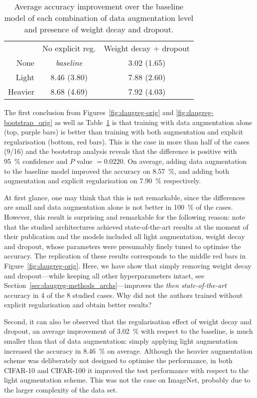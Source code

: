 {\begin{table}[hb]
\begin{center}
\begin{tabular}{rcc}
            & No explicit reg.  & Weight decay + dropout \\
    None    & \textit{baseline} & 3.02 (1.65)            \\
    Light   & 8.46 (3.80)       & 7.88 (2.60)            \\
    Heavier & 8.68 (4.69)       & 7.92 (4.03) 
\end{tabular}
\end{center}
\caption{Average accuracy improvement over the baseline model of each combination of data augmentation level and presence of weight decay and dropout.}
\label{tab:daugreg-orig_nets}
\end{table}

The first conclusion from Figures~\ref{fig:daugreg-orig} and \ref{fig:daugreg-bootstrap_orig} as well as Table~\ref{tab:daugreg-orig_nets} is that training with data augmentation alone (top, purple bars) is better than training with both augmentation and explicit regularisation (bottom, red bars). This is the case in more than half of the cases (9/16) and the bootstrap analysis reveals that the difference is positive with 95~\% confidence and $P$ value $=0.0220$. On average, adding data augmentation to the baseline model improved the accuracy on 8.57~\%, and adding both augmentation and explicit regularisation on 7.90~\% respectively.

At first glance, one may think that this is not remarkable, since the differences are small and data augmentation alone is not better in 100~\% of the cases. However, this result is surprising and remarkable for the following reason: note that the studied architectures achieved state-of-the-art results at the moment of their publication and the models included all light augmentation, weight decay and dropout, whose parameters were presumably finely tuned to optimise the accuracy. The replication of these results corresponds to the middle red bars in Figure~\ref{fig:daugreg-orig}. Here, we have show that simply removing weight decay and dropout---while keeping all other hyperparameters intact, see Section~\ref{sec:daugreg-methods_archs}---improves the \textit{then state-of-the-art} accuracy in 4 of the 8 studied cases. Why did not the authors trained without explicit regularisation and obtain better results?

Second, it can also be observed that the regularisation effect of weight decay and dropout, an average improvement of 3.02~\% with respect to the baseline, is much smaller than that of data augmentation: simply applying light augmentation increased the accuracy in 8.46~\% on average. Although the heavier augmentation scheme was deliberately not designed to optimise the performance, in both CIFAR-10 and CIFAR-100 it improved the test performance with respect to the light augmentation scheme. This was not the case on ImageNet, probably due to the larger complexity of the data set. 

}
